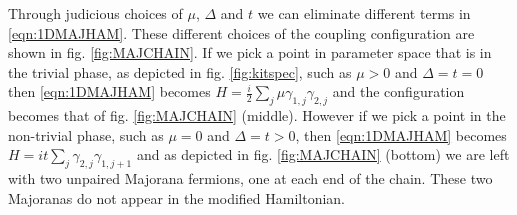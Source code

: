 \noi Through judicious choices of $\mu$, $\Delta$ and $t$ we can eliminate different terms in \eqref{eqn:1DMAJHAM}. These different choices of the coupling configuration are shown in fig. \ref{fig:MAJCHAIN}. If we pick a point in parameter space that is in the trivial phase, as depicted in fig. \ref{fig:kitspec}, such as $\mu>0$ and $\Delta=t=0$ then \eqref{eqn:1DMAJHAM} becomes $H=\frac{i}{2}\sum_{j}\mu \gamma_{1,j}\gamma_{2,j}$ and the configuration becomes that of fig. \ref{fig:MAJCHAIN} (middle). However if we pick a point in the non-trivial phase, such as $\mu=0$ and $\Delta=t>0$, then \eqref{eqn:1DMAJHAM} becomes $H=it\sum_{j}\gamma_{2,j}\gamma_{1,j+1}$ and as depicted in fig. \ref{fig:MAJCHAIN} (bottom) we are left with two unpaired Majorana fermions, one at each end of the chain. These two Majoranas do not appear in the modified Hamiltonian.
